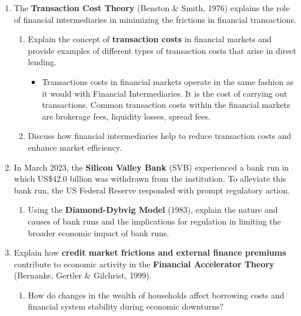 \begin{enumerate}
    \item The \textbf{Transaction Cost Theory} (Benston \& Smith, 1976) explains the role of
    financial intermediaries in minimizing the frictions in financial transactions. 
    
    \begin{enumerate}
        \item Explain the concept of \textbf{transaction costs} in financial markets and provide
        examples of different types of transaction costs that arise in direct lending.

        \begin{itemize}
            \item Transactions costs in financial markets operate in the same fashion as it would with Financial Intermediaries. It is the cost of carrying out transactions. Common transaction costs within the financial markets are brokerage fees, liquidity losses, spread fees. 
        \end{itemize}
        
        \item Discuss how financial intermediaries help to reduce transaction costs and
        enhance market efficiency.
    \end{enumerate}

    \item In March 2023, the \textbf{Silicon Valley Bank} (SVB) experienced a bank run in which
    US\$42.0 billion was withdrawn from the institution. To alleviate this bank run,
    the US Federal Reserve responded with prompt regulatory action. 
    
    \begin{enumerate}
        \item Using the \textbf{Diamond-Dybvig Model} (1983), explain the nature and causes of 
        bank runs and the implications for regulation in limiting the broader economic impact 
        of bank runs.
    \end{enumerate}

    \item Explain how \textbf{credit market frictions and external finance premiums} contribute
    to economic activity in the \textbf{Financial Accelerator Theory} (Bernanke, Gertler \&
    Gilchrist, 1999). 
    
    \begin{enumerate}
        \item How do changes in the wealth of households affect borrowing
        costs and financial system stability during economic downturns? 
        

\end{enumerate}
\end{enumerate}
